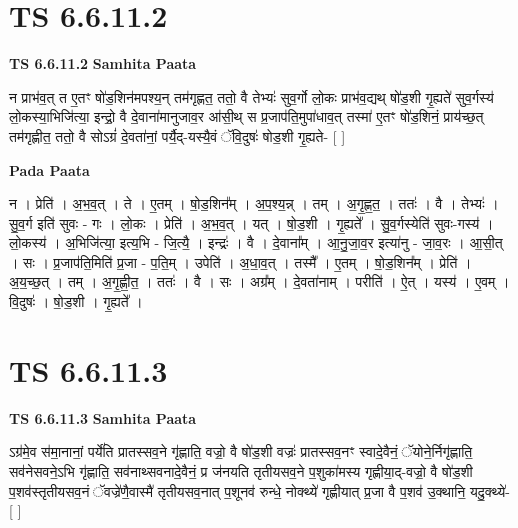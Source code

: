 \documentclass[17pt]{extarticle}
\begin{document}
\section*{ TS 6.6.11.2 }

\textbf{TS 6.6.11.2 } \newline
\textbf{Samhita Paata} \newline

न प्राभ॑व॒त् त ए॒तꣳ षो॑ड॒शिन॑मपश्य॒न् तम॑गृह्णत॒ ततो॒ वै तेभ्यः॑ सुव॒र्गो लो॒कः प्राभ॑व॒द्यथ् षो॑ड॒शी गृ॒ह्यते॑ सुव॒र्गस्य॑ लो॒कस्या॒भिजि॑त्या॒ इन्द्रो॒ वै दे॒वाना॑मानुजाव॒र आ॑सी॒थ् स प्र॒जाप॑ति॒मुपा॑धाव॒त् तस्मा॑ ए॒तꣳ षो॑ड॒शिनं॒ प्राय॑च्छ॒त् तम॑गृह्णीत॒ ततो॒ वै सोऽग्रं॑ दे॒वता॑नां॒ पर्यै॒द्-यस्यै॒वं ॅवि॒दुषः॑ षोड॒शी गृ॒ह्यते- [  ] \newline

\textbf{Pada Paata} \newline

न । प्रेति॑ । अ॒भ॒व॒त् । ते । ए॒तम् । षो॒ड॒शिन᳚म् । अ॒प॒श्य॒न्न् । तम् । अ॒गृ॒ह्ण॒त॒ । ततः॑ । वै । तेभ्यः॑ । सु॒व॒र्ग इति॑ सुवः - गः । लो॒कः । प्रेति॑ । अ॒भ॒व॒त् । यत् । षो॒ड॒शी । गृ॒ह्यते᳚ । सु॒व॒र्गस्येति॑ सुवः-गस्य॑ । लो॒कस्य॑ । अ॒भिजि॑त्या॒ इत्य॒भि - जि॒त्यै॒ । इन्द्रः॑ । वै । दे॒वाना᳚म् । आ॒नु॒जा॒व॒र इत्या॑नु - जा॒व॒रः । आ॒सी॒त् । सः । प्र॒जाप॑ति॒मिति॑ प्र॒जा - प॒ति॒म् । उपेति॑ । अ॒धा॒व॒त् । तस्मै᳚ । ए॒तम् । षो॒ड॒शिन᳚म् । प्रेति॑ । अ॒य॒च्छ॒त् । तम् । अ॒गृ॒ह्णी॒त॒ । ततः॑ । वै । सः । अग्र᳚म् । दे॒वता॑नाम् । परीति॑ । ऐ॒त् । यस्य॑ । ए॒वम् । वि॒दुषः॑ । षो॒ड॒शी । गृ॒ह्यते᳚ ।  \newline




\section*{ TS 6.6.11.3 }

\textbf{TS 6.6.11.3 } \newline
\textbf{Samhita Paata} \newline

ऽग्र॑मे॒व स॑मा॒नानां॒ पर्ये॑ति प्रातस्सव॒ने गृ॑ह्णाति॒ वज्रो॒ वै षो॑ड॒शी वज्रः॑ प्रातस्सव॒नꣳ स्वादे॒वैनं॒ ॅयोने॒र्निगृ॑ह्णाति॒ सव॑नेसवने॒ऽभि गृ॑ह्णाति॒ सव॑नाथ्सवनादे॒वैनं॒ प्र ज॑नयति तृतीयसव॒ने प॒शुका॑मस्य गृह्णीया॒द्-वज्रो॒ वै षो॑ड॒शी प॒शव॑स्तृतीयसव॒नं ॅवज्रे॑णै॒वास्मै॑ तृतीयसव॒नात् प॒शूनव॑ रुन्धे॒ नोक्थ्ये॑ गृह्णीयात् प्र॒जा वै प॒शव॑ उ॒क्थानि॒ यदु॒क्थ्ये॑- [  ] \newline
\end{document}
